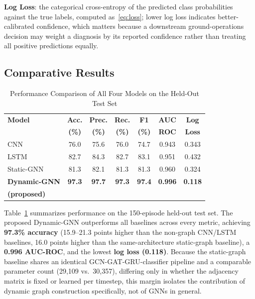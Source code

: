 \documentclass[conference]{IEEEtran}
\begin{document}
\textbf{Log Loss}: the categorical cross-entropy of the predicted class probabilities against
the true labels, computed as~\eqref{eq:loss}; lower log loss indicates better-calibrated
confidence, which matters because a downstream ground-operations decision may weight a
diagnosis by its reported confidence rather than treating all positive predictions equally.

\subsection{Comparative Results}

\begin{table}[htbp]
\caption{Performance Comparison of All Four Models on the Held-Out Test Set}
\begin{center}
\begin{tabular}{|l|c|c|c|c|c|c|}
\hline
\textbf{Model} & \textbf{Acc.} & \textbf{Prec.} & \textbf{Rec.} & \textbf{F1} & \textbf{AUC} & \textbf{Log} \\
 & \textbf{(\%)} & \textbf{(\%)} & \textbf{(\%)} & \textbf{(\%)} & \textbf{ROC} & \textbf{Loss} \\
\hline
CNN & 76.0 & 75.6 & 76.0 & 74.7 & 0.943 & 0.343 \\
\hline
LSTM & 82.7 & 84.3 & 82.7 & 83.1 & 0.951 & 0.432 \\
\hline
Static-GNN & 81.3 & 82.1 & 81.3 & 81.3 & 0.960 & 0.324 \\
\hline
\textbf{Dynamic-GNN} & \textbf{97.3} & \textbf{97.7} & \textbf{97.3} & \textbf{97.4} & \textbf{0.996} & \textbf{0.118} \\
\textbf{(proposed)} & & & & & & \\
\hline
\end{tabular}
\label{tab:performance}
\end{center}
\end{table}

Table~\ref{tab:performance} summarizes performance on the 150-episode held-out test set. The
proposed Dynamic-GNN outperforms all baselines across every metric, achieving \textbf{97.3\%
accuracy} (15.9--21.3 points higher than the non-graph CNN/LSTM baselines, 16.0 points higher
than the same-architecture static-graph baseline), a \textbf{0.996 AUC-ROC}, and the lowest
\textbf{log loss (0.118)}. Because the static-graph baseline shares an identical
GCN-GAT-GRU-classifier pipeline and a comparable parameter count (29{,}109 vs.\ 30{,}357),
differing only in whether the adjacency matrix is fixed or learned per timestep, this margin
isolates the contribution of dynamic graph construction specifically, not of GNNs in general.
\end{document}
